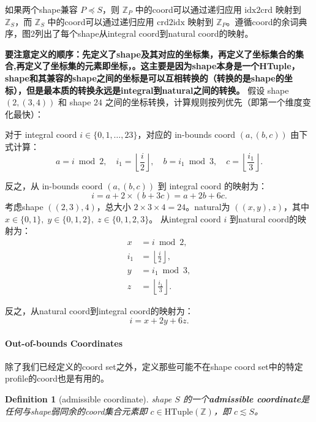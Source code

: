 \documentclass{article}
\newtheorem{definition}{Definition}[section]
\begin{document}
如果两个shape兼容 \(P \preceq S\)，则 \(\mathbb{Z}_P\) 中的coord可以通过递归应用 \(\mathrm{idx2crd}\) 映射到 \(\mathbb{Z}_S\)，而 \(\mathbb{Z}_S\) 中的coord可以通过递归应用 \(\mathrm{crd2idx}\) 映射到 \(\mathbb{Z}_P\)。遵循coord的余词典序，图2列出了每个shape从integral coord到natural coord的映射。
\begin{mycomment}
\textbf{要注意定义的顺序：先定义了shape及其对应的坐标集，再定义了坐标集合的集合,再定义了坐标集的元素即坐标，。这主要是因为shape本身是一个HTuple，shape和其兼容的shape之间的坐标是可以互相转换的（转换的是shape的坐标），但是最本质的转换永远是integral到natural之间的转换。}
假设 shape \((2, (3,4))\) 和 shape \(24\) 之间的坐标转换，计算规则按列优先（即第一个维度变化最快）：

对于 integral coord \(i \in \{0,1,\dots,23\}\)，对应的 in-bounds coord \((a, (b, c))\) 由下式计算：
\[
a = i \bmod 2, \quad
i_1 = \left\lfloor \frac{i}{2} \right\rfloor, \quad
b = i_1 \bmod 3, \quad
c = \left\lfloor \frac{i_1}{3} \right\rfloor.
\]

反之，从 in-bounds coord \((a, (b, c))\) 到 integral coord 的映射为：
\[
i = a + 2 \times (b + 3c) = a + 2b + 6c.
\]
考虑shape \(((2,3),4)\)，总大小 \(2 \times 3 \times 4 = 24\)。natural为 \(((x, y), z)\)，其中 \(x \in \{0,1\},\; y \in \{0,1,2\},\; z \in \{0,1,2,3\}\)。
从integral coord \(i\) 到natural coord的映射为：
\[
\begin{aligned}
x &= i \bmod 2, \\
i_1 &= \left\lfloor \frac{i}{2} \right\rfloor, \\
y &= i_1 \bmod 3, \\
z &= \left\lfloor \frac{i_1}{3} \right\rfloor.
\end{aligned}
\]

反之，从natural coord到integral coord的映射为：
\[
i = x + 2y + 6z.
\]
\end{mycomment}
\paragraph{Out-of-bounds Coordinates}
除了我们已经定义的coord set之外，定义那些可能不在shape coord set中的特定profile的coord也是有用的。

\begin{definition}[admissible coordinate]
shape \(S\) 的一个\textbf{admissible coordinate}是任何与shape弱同余的coord集合元素即 \(c \in \mathrm{HTuple}(\mathbb{Z})\)，即 \(c \lesssim S\)。
\end{definition}
\end{document}
